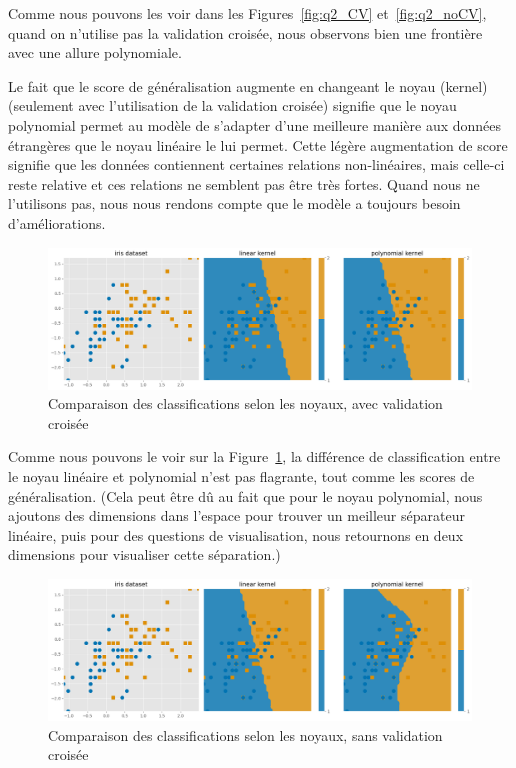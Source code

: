 \documentclass{article}
\begin{document}
Comme nous pouvons les voir dans les Figures~\ref{fig:q2_CV} et~\ref{fig:q2_noCV}, quand on n'utilise pas la validation croisée, nous observons bien une frontière avec une allure polynomiale.

Le fait que le score de généralisation augmente en changeant le noyau (kernel) (seulement avec l'utilisation de la validation croisée) signifie que le noyau polynomial permet au modèle de s'adapter d'une meilleure manière aux données étrangères que le noyau linéaire le lui permet. Cette légère augmentation de score signifie que les données contiennent certaines relations non-linéaires, mais celle-ci reste relative et ces relations ne semblent pas être très fortes. Quand nous ne l'utilisons pas, nous nous rendons compte que le modèle a toujours besoin d'améliorations.\\

\begin{figure}[H]
    \centering
    \includegraphics[width=.9\linewidth]{outputs/q2_compare.png}
    \caption{Comparaison des classifications selon les noyaux, avec validation croisée}
    \label{fig:q2_compare}
\end{figure}

Comme nous pouvons le voir sur la Figure~\ref{fig:q2_compare}, la différence de classification entre le noyau linéaire et polynomial n'est pas flagrante, tout comme les scores de généralisation. (Cela peut être dû au fait que pour le noyau polynomial, nous ajoutons des dimensions dans l'espace pour trouver un meilleur séparateur linéaire, puis pour des questions de visualisation, nous retournons en deux dimensions pour visualiser cette séparation.)

\begin{figure}[H]
    \centering
    \includegraphics[width=.9\linewidth]{outputs/q2_compare_noCV.png}
    \caption{Comparaison des classifications selon les noyaux, sans validation croisée}
    \label{fig:q2_compare_noCV}
\end{figure}
\end{document}
